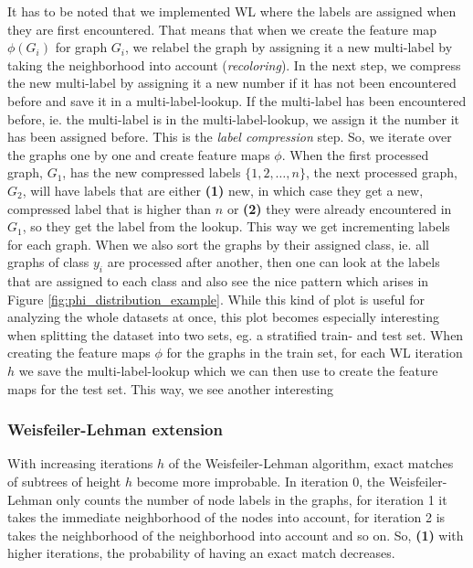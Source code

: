 It has to be noted that we implemented WL where the labels are assigned when they are first encountered. That means that when we create the feature map $\phi(G_i)$ for graph $G_i$, we relabel the graph by assigning it a new multi-label by taking the neighborhood into account (\textit{recoloring}). In the next step, we compress the new multi-label by assigning it a new number if it has not been encountered before and save it in a multi-label-lookup. If the multi-label has been encountered before, ie. the multi-label is in the multi-label-lookup, we assign it the number it has been assigned before.
This is the \textit{label compression} step.
So, we iterate over the graphs one by one and create feature maps $\phi$.
When the first processed graph, $G_1$, has the new compressed labels $\{1, 2, \ldots, n\}$, the next processed graph, $G_2$, will have labels that are either \textbf{(1)} new, in which case they get a new, compressed label that is higher than $n$ or \textbf{(2)} they were already encountered in $G_1$, so they get the label from the lookup.
This way we get incrementing labels for each graph.
When we also sort the graphs by their assigned class, ie. all graphs of class $y_i$ are processed after another, then one can look at the labels that are assigned to each class and also see the nice pattern which arises in Figure \ref{fig:phi_distribution_example}.
While this kind of plot is useful for analyzing the whole datasets at once, this plot becomes especially interesting when splitting the dataset into two sets, eg. a stratified train- and test set.
When creating the feature maps $\phi$ for the graphs in the train set, for each WL iteration $h$ we save the multi-label-lookup which we can then use to create the feature maps for the test set.
This way, we see another interesting 


\subsubsection{Weisfeiler-Lehman extension}
With increasing iterations $h$ of the Weisfeiler-Lehman algorithm, exact matches of subtrees of height $h$ become more improbable.
In iteration 0, the Weisfeiler-Lehman only counts the number of node labels in the graphs, for iteration 1 it takes the immediate neighborhood of the nodes into account, for iteration 2 is takes the neighborhood of the neighborhood into account and so on.
So, \textbf{(1)} with higher iterations, the probability of having an exact match decreases.

